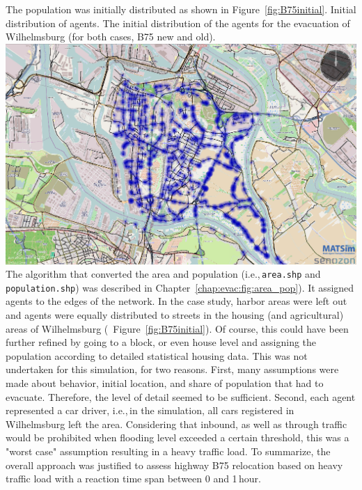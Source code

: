The population was initially distributed as shown in Figure~\ref{fig:B75initial}. 
%
\createfigure%
{Initial distribution of agents.}%
{The initial distribution of the agents for the evacuation of Wilhelmsburg (for both cases, B75 new and old).}%
{\label{fig:B75initial}}%
{\includegraphics[width=0.7\linewidth]{using/figures/B75initial}}%
{}
The algorithm that converted the area and population (i.e.,\,\lstinline|area.shp| and \lstinline|population.shp|) was described in Chapter~\ref{chap:evac:fig:area_pop}). It assigned agents to the edges of the network. In the case study, harbor areas were left out and agents were equally distributed to streets in the housing (and agricultural) areas of Wilhelmsburg (\ Figure~\ref{fig:B75initial}).
Of course, this could have been further refined by going to a block, or even house level and assigning the population according to detailed statistical housing data. This was not undertaken for this simulation, for two reasons. First, many assumptions were made about behavior, initial location, and share of population that had to evacuate. Therefore, the level of detail seemed to be sufficient. Second, each agent represented a car driver, i.e.,\,in the simulation, all cars registered in Wilhelmsburg left the area. Considering that inbound, as well as through traffic would be prohibited when flooding level exceeded a certain threshold, this was a "worst case" assumption resulting in a heavy traffic load. To summarize, the overall approach was justified to assess highway B75 relocation based on heavy traffic load with a reaction time span between 0 and 1\,hour.


